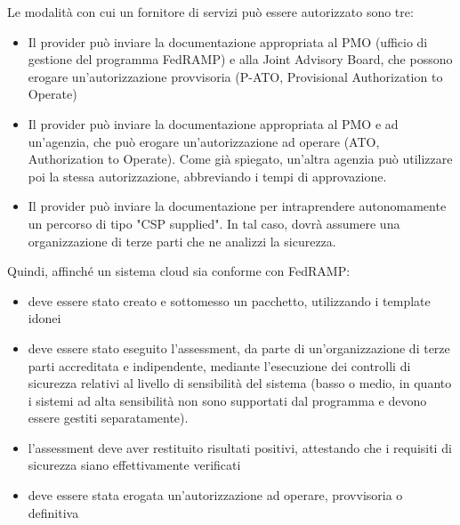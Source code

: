 \documentclass[../main.tex]{subfiles}
\begin{document}
Le modalità con cui un fornitore di servizi può essere autorizzato sono tre:
\begin{itemize}
    \item Il provider può inviare la documentazione appropriata al PMO (ufficio di gestione del programma FedRAMP) e alla Joint Advisory Board, che possono erogare un'autorizzazione provvisoria (P-ATO, Provisional Authorization to Operate) 
    \item Il provider può inviare la documentazione appropriata al PMO e ad un'agenzia, che può erogare un'autorizzazione ad operare (ATO, Authorization to Operate). Come già spiegato, un'altra agenzia può utilizzare poi la stessa autorizzazione, abbreviando i tempi di approvazione.
    \item Il provider può inviare la documentazione per intraprendere autonomamente un percorso di tipo "CSP supplied". In tal caso, dovrà assumere una organizzazione di terze parti che ne analizzi la sicurezza.
\end{itemize}

Quindi, affinché un sistema cloud sia conforme con FedRAMP:
\begin{itemize}
    \item deve essere stato creato e sottomesso un pacchetto, utilizzando i template idonei
    \item deve essere stato eseguito l'assessment, da parte di un'organizzazione di terze parti accreditata e indipendente, mediante l'esecuzione dei controlli di sicurezza relativi al livello di sensibilità del sistema (basso o medio, in quanto i sistemi ad alta sensibilità non sono supportati dal programma e devono essere gestiti separatamente).
    \item l'assessment deve aver restituito risultati positivi, attestando che i requisiti di sicurezza siano effettivamente verificati
    \item deve essere stata erogata un'autorizzazione ad operare, provvisoria o definitiva
\end{itemize}
\end{document}

